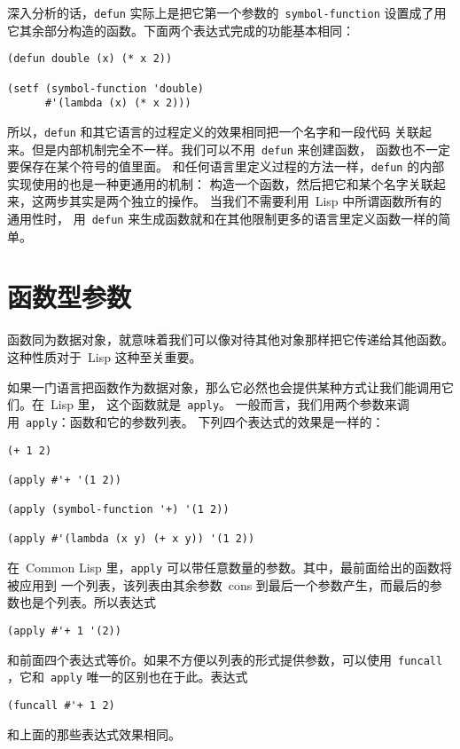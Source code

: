 深入分析的话，\verb|defun| 实际上是把它第一个参数的~\verb|symbol-function|
设置成了用它其余部分构造的函数。下面两个表达式完成的功能基本相同：
\begin{lstlisting}
(defun double (x) (* x 2))

(setf (symbol-function 'double)
      #'(lambda (x) (* x 2)))
\end{lstlisting}
所以，\texttt{defun} 和其它语言的过程定义的效果相同\pozhehao{}把一个名字和一段代码
关联起来。但是内部机制完全不一样。我们可以不用~\texttt{defun} 来创建函数，
函数也不一定要保存在某个符号的值里面。
和任何语言里定义过程的方法一样，\texttt{defun} 的内部实现使用的也是一种更通用的机制：
构造一个函数，然后把它和某个名字关联起来，这两步其实是两个独立的操作。
当我们不需要利用~Lisp 中所谓函数所有的通用性时，
用~\texttt{defun} 来生成函数就和在其他限制更多的语言里定义函数一样的简单。

\section{函数型参数}
\label{sec:functional-arguments}

函数同为数据对象，就意味着我们可以像对待其他对象那样把它传递给其他函数。
这种性质对于~Lisp 这种\bup{}至关重要。

如果一门语言把函数作为数据对象，那么它必然也会提供某种方式让我们能调用它们。在~Lisp 里，
这个函数就是~\verb|apply|。
一般而言，我们用两个参数来调用~\verb|apply|：函数和它的参数列表。
下列四个表达式的效果是一样的：
\begin{lstlisting}
(+ 1 2)

(apply #'+ '(1 2))

(apply (symbol-function '+) '(1 2))

(apply #'(lambda (x y) (+ x y)) '(1 2))
\end{lstlisting}
在~Common Lisp 里，\texttt{apply} 可以带任意数量的参数。其中，最前面给出的函数将被应用到
一个列表，该列表由其余参数~cons 到最后一个参数产生，而最后的参数也是个列表。所以表达式
\begin{lstlisting}
(apply #'+ 1 '(2))
\end{lstlisting}
和前面四个表达式等价。如果不方便以列表的形式提供参数，可以使用~\texttt{funcall}
，它和~\texttt{apply} 唯一的区别也在于此。表达式
\begin{lstlisting}
(funcall #'+ 1 2)
\end{lstlisting}
和上面的那些表达式效果相同。

